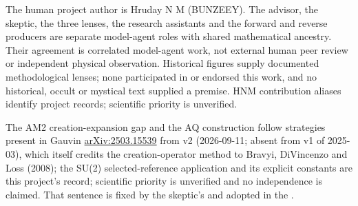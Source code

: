 \documentclass[11pt,a4paper]{article}
\begin{document}
The human project author is Hruday N M (BUNZEEY). The advisor, the skeptic,
the three lenses, the research assistants and the forward and reverse
producers are separate model-agent roles with shared mathematical ancestry.
Their agreement is correlated model-agent work, not external human peer review
or independent physical observation. Historical figures supply documented
methodological lenses; none participated in or endorsed this work, and no
historical, occult or mystical text supplied a premise. HNM contribution
aliases identify project records; scientific priority is unverified.

The AM2 creation-expansion gap and the AQ construction follow strategies
present in Gauvin
\href{https://arxiv.org/abs/2503.15539v2}{arXiv:2503.15539} from v2
(2026-09-11; absent from v1 of 2025-03), which itself credits the
creation-operator method to Bravyi, DiVincenzo and Loss (2008); the SU(2)
selected-reference application and its explicit constants are this project's
record; scientific priority is unverified and no independence is claimed.
That sentence is fixed by the skeptic's
and adopted in the
.










\appendix


\end{document}
